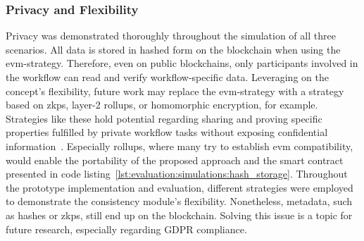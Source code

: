 \subsubsection{Privacy and Flexibility}
\label{sec:evaluation:simulations:privacy_flexbility}
Privacy was demonstrated thoroughly throughout the simulation of all three scenarios. All data is stored in hashed form on the blockchain when using the \gls{evm}-strategy. Therefore, even on public blockchains, only participants involved in the workflow can read and verify workflow-specific data. Leveraging on the concept's flexibility, future work may replace the \gls{evm}-strategy with a strategy based on \glspl{zkp}, layer-2 rollups, or homomorphic encryption, for example. Strategies like these hold potential regarding sharing and proving specific properties fulfilled by private workflow tasks without exposing confidential information~\cite{blockchain_for_secure_io_bp,sun2021_survey_of_zkp_on_blockchain}. Especially rollups, where many try to establish \gls{evm} compatibility, would enable the portability of the proposed approach and the smart contract presented in code listing~\ref{lst:evaluation:simulations:hash_storage}. Throughout the prototype implementation and evaluation, different strategies were employed to demonstrate the consistency module's flexibility. Nonetheless, metadata, such as hashes or \glspl{zkp}, still end up on the blockchain. Solving this issue is a topic for future research, especially regarding GDPR compliance.



